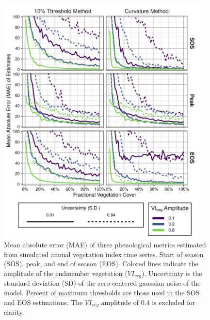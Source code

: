 \documentclass{article}
\begin{document}
\begin{figure}[h]
    \centering
    \includegraphics[width=0.95\textwidth]{figures/fig3_sim_mae.png}
    \caption{Mean absolute error (MAE) of three phenological metrics estimated from simulated annual vegetation index time series. Start of season (SOS), peak, and end of season (EOS). Colored lines indicate the amplitude of the endmember vegetation ($VI_{veg}$). Uncertainty is the standard deviation (SD) of the zero-centered gaussian noise of the model. Percent of maximum thresholds are those used in the SOS and EOS estimations. The $VI_{veg}$  amplitude of 0.4 is excluded for clarity.}
    \label{fig3}
\end{figure}
\end{document}
